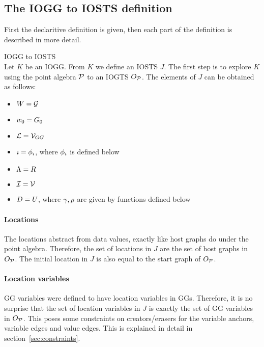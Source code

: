 \subsection{The IOGG to IOSTS definition}
First the declaritive definition is given, then each part of the definition is described in more detail.
\vspace{2px}\begin{definition} IOGG to IOSTS \\
Let $K$ be an IOGG. From $K$ we define an IOSTS $J$. The first step is to explore $K$ using the point algebra $\mathcal{P}$ to an IOGTS $O_{\mathcal{P}}$. The elements of $J$ can be obtained as follows:
\begin{itemize}
\item $W = \mathcal{G}$
\item $w_0 = G_0$
\item $\mathcal{L} = \mathcal{V}_{GG}$
\item $\imath = \phi_{\imath}$, where $\phi_{\imath}$ is defined below
\item $\Lambda = R$
\item $\mathcal{I} = \mathcal{V}$
\item $D = U$, where $\gamma, \rho$ are given by functions defined below
\end{itemize}
\end{definition}

\paragraph*{Locations} The locations abstract from data values, exactly like host graphs do under the point algebra. Therefore, the set of locations in $J$ are the set of host graphs in $O_{\mathcal{P}}$. The initial location in $J$ is also equal to the start graph of $O_{\mathcal{P}}$.

\paragraph*{Location variables} GG variables were defined to have location variables in GGs. Therefore, it is no surprise that the set of location variables in $J$ is exactly the set of GG variables in $O_{\mathcal{P}}$. This poses some constraints on creators/erasers for the variable anchors, variable edges and value edges. This is explained in detail in section~\ref{sec:constraints}.

